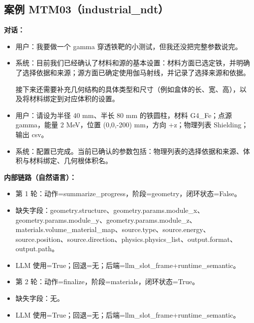 \documentclass[11pt]{ctexart}
\begin{document}
\subsection{案例 MTM03（industrial\_ndt）}
\textbf{对话：}
\begin{itemize}
\item 用户：我要做一个 gamma 穿透铁靶的小测试，但我还没把完整参数说完。
\item 系统：目前我们已经确认了材料和源的基本设置：材料方面已选定铁，并明确了选择依据和来源；源方面已确定使用伽马射线，并记录了选择来源和依据。

接下来还需要补充几何结构的具体类型和尺寸（例如盒体的长、宽、高），以及将材料绑定到对应体积的设置。
\item 用户：请设为半径 40 mm、半长 80 mm 的铁圆柱，材料 G4\_Fe；点源 gamma，能量 2 MeV，位置 (0,0,-200) mm，方向 +z；物理列表 Shielding；输出 csv。
\item 系统：配置已完成。当前已确认的参数包括：物理列表的选择依据和来源、体积与材料绑定、几何根体积名。
\end{itemize}
\textbf{内部链路（自然语言）：}
\begin{itemize}
\item 第 1 轮：动作=summarize\_progress，阶段=geometry，闭环状态=False。
\item 缺失字段：geometry.structure、geometry.params.module\_x、geometry.params.module\_y、geometry.params.module\_z、materials.volume\_material\_map、source.type、source.energy、source.position、source.direction、physics.physics\_list、output.format、output.path。
\item LLM 使用=True；回退=无；后端=llm\_slot\_frame+runtime\_semantic。
\item 第 2 轮：动作=finalize，阶段=materials，闭环状态=True。
\item 缺失字段：无。
\item LLM 使用=True；回退=无；后端=llm\_slot\_frame+runtime\_semantic。
\end{itemize}
\end{document}

